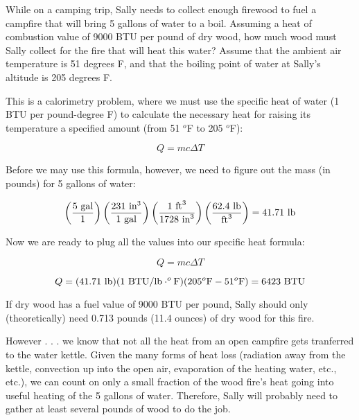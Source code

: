 

While on a camping trip, Sally needs to collect enough firewood to fuel a campfire that will bring 5 gallons of water to a boil.  Assuming a heat of combustion value of 9000 BTU per pound of dry wood, how much wood must Sally collect for the fire that will heat this water?  Assume that the ambient air temperature is 51 degrees F, and that the boiling point of water at Sally's altitude is 205 degrees F.







This is a calorimetry problem, where we must use the specific heat of water (1 BTU per pound-degree F) to calculate the necessary heat for raising its temperature a specified amount (from 51 $^{o}$F to 205 $^{o}$F):

$$Q = mc \Delta T$$

Before we may use this formula, however, we need to figure out the mass (in pounds) for 5 gallons of water:

$$\left(5 \hbox{ gal} \over 1 \right) \left( 231 \hbox{ in}^3 \over 1 \hbox{ gal} \right) \left(1 \hbox{ ft}^3 \over 1728 \hbox{ in}^3 \right) \left( 62.4 \hbox{ lb} \over \hbox{ft}^3 \right) = 41.71 \hbox{ lb}$$

Now we are ready to plug all the values into our specific heat formula:

$$Q = mc \Delta T$$

$$Q = (41.71 \hbox{ lb}) (1 \hbox{ BTU/lb}\cdot^o\hbox{F}) (205^o\hbox{F} - 51^o\hbox{F}) = 6423 \hbox{ BTU}$$

If dry wood has a fuel value of 9000 BTU per pound, Sally should only (theoretically) need 0.713 pounds (11.4 ounces) of dry wood for this fire.

\vskip 10pt

However . . . we know that not all the heat from an open campfire gets tranferred to the water kettle.  Given the many forms of heat loss (radiation away from the kettle, convection up into the open air, evaporation of the heating water, etc., etc.), we can count on only a small fraction of the wood fire's heat going into useful heating of the 5 gallons of water.  Therefore, Sally will probably need to gather at least several pounds of wood to do the job.












